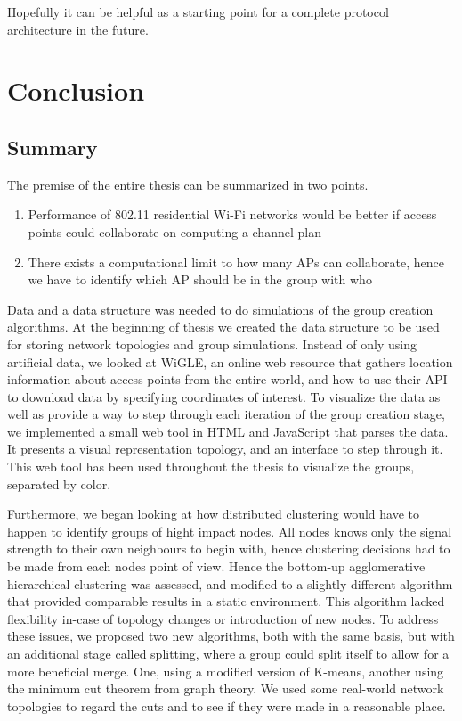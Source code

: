 Hopefully it can be helpful as a starting point for a complete protocol architecture in the future. 

\chapter{Conclusion}

\section{Summary}
The premise of the entire thesis can be summarized in two points. 
\begin{enumerate}
	\item Performance of 802.11 residential Wi-Fi networks would be better if access points could collaborate on computing a channel plan
	\item There exists a computational limit to how many APs can collaborate, hence we have to identify which AP should be in the group with who
\end{enumerate}

Data and a data structure was needed to do simulations of the group creation algorithms. At the beginning of thesis we created the data structure
to be used for storing network topologies and group simulations. Instead of only using artificial data, we looked at WiGLE, an online web resource that gathers location information about access points from the entire world, and how to use their API to download data by specifying coordinates of interest.
To visualize the data as well as provide a way to step through each iteration of the group creation stage, we implemented a small web tool in HTML and JavaScript that parses the data.
It presents a visual representation topology, and an interface to step through it. This web tool has been used throughout the thesis to visualize the groups, separated by color. 

Furthermore, we began looking at how distributed clustering would have to happen to identify groups of hight impact nodes.
All nodes knows only the signal strength to their own neighbours to begin with, hence clustering decisions had to be made from each nodes point of view. Hence the bottom-up agglomerative 
hierarchical clustering was assessed, and modified to a slightly different algorithm that provided comparable results in a static environment. This algorithm lacked flexibility in-case of
topology changes or introduction of new nodes. To address these issues, we proposed two new algorithms, both with the same basis, but with an additional stage called splitting, where a group could split itself to allow for a more beneficial merge. One, using a modified version of K-means, another using the minimum cut theorem from graph theory. We used some real-world network topologies
to regard the cuts and to see if they were made in a reasonable place.  

